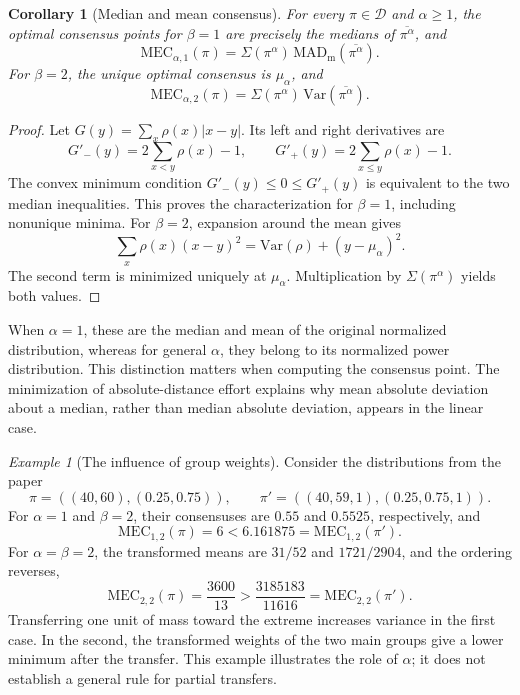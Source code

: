 \documentclass{article}
\theoremstyle{plain}
\newtheorem{corollary}{Corollary}
\theoremstyle{remark}
\newtheorem{example}{Example}
\begin{document}
\begin{corollary}[Median and mean consensus]\label{cor:mec-median-mean}
For every $\pi\in\mathcal{D}$ and $\alpha\geq1$, the optimal consensus points for $\beta=1$ are precisely the medians of $\overline{\pi^\alpha}$, and
\begin{equation}\label{eq:mec-median-case}
\mathrm{MEC}_{\alpha,1}(\pi)
=\Sigma(\pi^\alpha)\,\mathrm{MAD}_{\mathrm m}(\overline{\pi^\alpha}).
\end{equation}
For $\beta=2$, the unique optimal consensus is $\mu_\alpha$, and
\begin{equation}\label{eq:mec-mean-case}
\mathrm{MEC}_{\alpha,2}(\pi)
=\Sigma(\pi^\alpha)\,\mathrm{Var}(\overline{\pi^\alpha}).
\end{equation}
\end{corollary}
\begin{proof}
Let $G(y)=\sum_x\rho(x)|x-y|$. Its left and right derivatives are
\[
G'_-(y)=2\sum_{x<y}\rho(x)-1,
\qquad
G'_+(y)=2\sum_{x\leq y}\rho(x)-1.
\]
The convex minimum condition $G'_-(y)\leq0\leq G'_+(y)$ is equivalent to the two median inequalities. This proves the characterization for $\beta=1$, including nonunique minima. For $\beta=2$, expansion around the mean gives
\[
\sum_x\rho(x)(x-y)^2
=\mathrm{Var}(\rho)+(y-\mu_\alpha)^2.
\]
The second term is minimized uniquely at $\mu_\alpha$. Multiplication by $\Sigma(\pi^\alpha)$ yields both values.
\end{proof}

When $\alpha=1$, these are the median and mean of the original normalized distribution, whereas for general $\alpha$, they belong to its normalized power distribution. This distinction matters when computing the consensus point. The minimization of absolute-distance effort explains why mean absolute deviation about a median, rather than median absolute deviation, appears in the linear case.

\begin{example}[The influence of group weights]\label{ex:mec-weighted-consensus}
Consider the distributions from the paper
\[
\pi=((40,60),(0.25,0.75)),
\qquad
\pi'=((40,59,1),(0.25,0.75,1)).
\]
For $\alpha=1$ and $\beta=2$, their consensuses are $0.55$ and $0.5525$, respectively, and
\[
\mathrm{MEC}_{1,2}(\pi)=6
<6.161875=\mathrm{MEC}_{1,2}(\pi').
\]
For $\alpha=\beta=2$, the transformed means are $31/52$ and $1721/2904$, and the ordering reverses,
\[
\mathrm{MEC}_{2,2}(\pi)=\frac{3600}{13}
>\frac{3185183}{11616}=\mathrm{MEC}_{2,2}(\pi').
\]
Transferring one unit of mass toward the extreme increases variance in the first case. In the second, the transformed weights of the two main groups give a lower minimum after the transfer. This example illustrates the role of $\alpha$; it does not establish a general rule for partial transfers.
\end{example}
\end{document}
